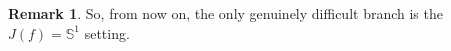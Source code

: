 \documentclass[12pt,a4paper,twoside]{article}
\theoremstyle{plain}
\newtheorem{proposition}[theorem]{Proposition}
\theoremstyle{definition}
\newtheorem{remark}[theorem]{Remark}
\newcommand{\cP}{{\mathcal P}}
\newcommand{\emp}{\mathsf e}
\newcommand{\Sone}{\mathbb{S}^1}
\begin{document}
	\begin{remark}
		So, from now on, the only genuinely difficult branch is the $J(f)=\Sone$ setting.
	\end{remark}

\end{document}
